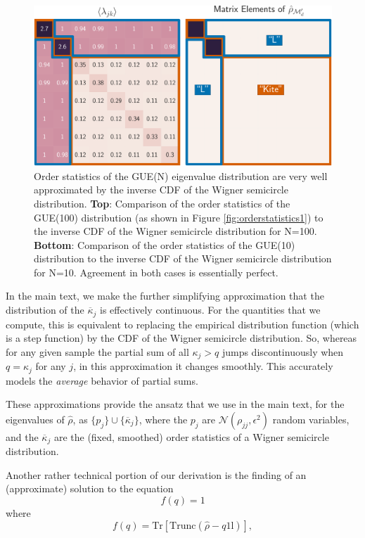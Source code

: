\documentclass[aps,pra, twocolumn]{revtex4}
\newcommand{\Tr}{\mathrm{Tr}}
\def\Id{1\!\mathrm{l}}
\begin{document}
\begin{figure}[h!]
\includegraphics[width=\columnwidth]{Images/Figure_6.pdf}
\caption{Order statistics of the GUE(N) eigenvalue distribution are very well approximated by the inverse CDF of the Wigner semicircle distribution.  \textbf{Top}:  Comparison of the order statistics of the GUE(100) distribution (as shown in Figure \ref{fig:orderstatistics1}) to the inverse CDF of the Wigner semicircle distribution for N=100.  \textbf{Bottom}:  Comparison of the order statistics of the GUE(10) distribution to the inverse CDF of the Wigner semicircle distribution for N=10.  Agreement in both cases is essentially perfect.}
\label{fig:orderstatistics2}
\end{figure}

In the main text, we make the further simplifying approximation that the distribution of the $\overline{\kappa}_j$ is effectively continuous.  For the quantities that we compute, this is equivalent to replacing the empirical distribution function (which is a step function) by the CDF of the Wigner semicircle distribution.  So, whereas for any given sample the partial sum of all $\kappa_j > q$ jumps discontinuously when $q=\kappa_j$ for any $j$, in this approximation it changes smoothly.  This accurately models the \emph{average} behavior of partial sums.

These approximations provide the ansatz that we use in the main text, for the eigenvalues of $\hat\rho$, as $\{p_j\} \cup \{\overline{\kappa}_j\}$, where the $p_j$ are $\mathcal{N}(\rho_{jj},\epsilon^2)$ random variables, and the $\overline{\kappa}_j$ are the (fixed, smoothed) order statistics of a Wigner semicircle distribution.  

Another rather technical portion of our derivation is the finding of an (approximate) solution to the equation
\begin{equation}
f(q) = 1
\end{equation}
 where
\begin{equation}
f(q) = \Tr\left[\mathrm{Trunc}(\hat\rho-q\Id)\right],
\end{equation}
\end{document}
